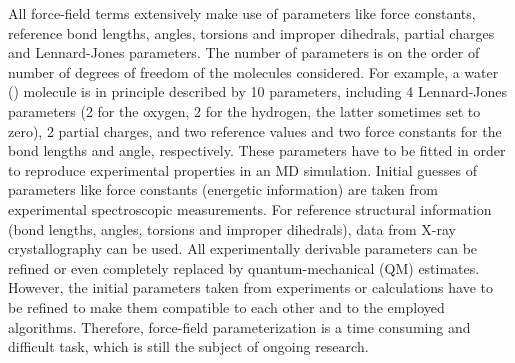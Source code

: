 
All force-field terms extensively make use of parameters like force constants,
reference bond lengths, angles, torsions and improper dihedrals,
partial charges and Lennard-Jones parameters. The number of parameters
is on the order of number of degrees of freedom of the molecules considered.
For example, a water () molecule is in principle
described by 10 parameters, including 4 Lennard-Jones parameters
(2 for the oxygen, 2 for the hydrogen, the latter sometimes set to zero),
2 partial charges, and two reference values and two force constants for the
bond lengths and angle, respectively.
%
These parameters have to
be fitted 
in order to reproduce experimental
properties in an MD simulation.
%
Initial guesses of parameters like force constants (energetic information) are
taken from experimental spectroscopic measurements.
%
For reference structural information (bond lengths, angles, torsions and improper dihedrals),
data from X-ray crystallography can be used.
%
All experimentally derivable parameters can be refined or even completely replaced
by quantum-mechanical (QM) estimates.
%
However, the initial parameters taken from experiments or calculations have
to be refined to make them compatible to each other and to the employed
algorithms.
%
Therefore, force-field parameterization is a time consuming and difficult task,
which is still the subject of ongoing research.\rem{[REF]}

